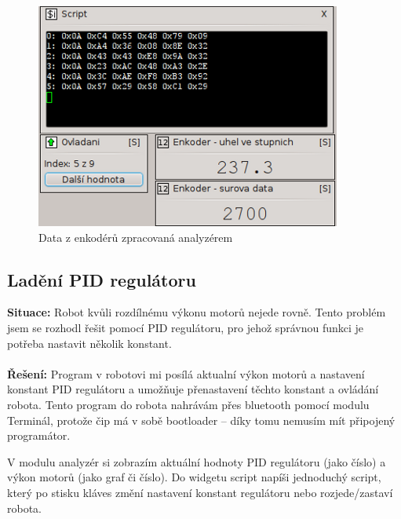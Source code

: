 \documentclass[12pt, a4paper, oneside]{article}
\begin{document}
\begin{figure}[H]
\begin{center}
\includegraphics{img/use_enc_analyzer.png}
\caption{Data z enkodérů zpracovaná analyzérem}
\label{Terminal}
\end{center}
\end{figure}

\newpage
\subsection{Ladění PID regulátoru}
{\bf Situace:} Robot kvůli rozdílnému výkonu motorů nejede rovně. Tento problém jsem se rozhodl řešit pomocí PID regulátoru, pro jehož správnou funkci je potřeba nastavit několik konstant. \\
\\
{\bf Řešení:} Program v robotovi mi posílá aktualní výkon motorů a nastavení konstant PID regulátoru a umožňuje přenastavení těchto konstant a ovládání robota. Tento program do robota nahrávám přes bluetooth pomocí modulu Terminál, protože čip má v sobě bootloader -- díky tomu nemusím mít připojený programátor.  

V modulu analyzér si zobrazím aktuální hodnoty PID regulátoru (jako číslo) a výkon motorů (jako graf či číslo). Do widgetu script napíši jednoduchý script, který po stisku kláves změní nastavení konstant regulátoru nebo rozjede/zastaví robota.
\end{document}
